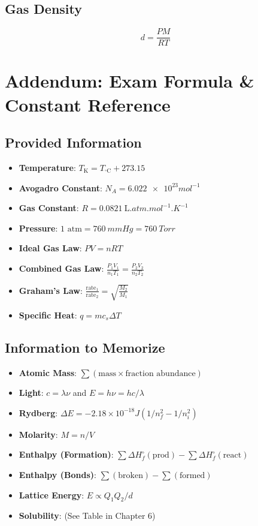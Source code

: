 \documentclass[11pt]{article}
\begin{document}
\subsection{Gas Density}
\begin{tcolorbox}[memorize, title=Gas Density (Must Memorize)]
    \[ d = \frac{PM}{RT} \]
\end{tcolorbox}

\newpage

\section*{Addendum: Exam Formula \& Constant Reference}

\subsection*{Provided Information}
\begin{itemize}
    \item \textbf{Temperature}: $T_{\si{\kelvin}} = T_{^\circ\text{C}} + 273.15$
    \item \textbf{Avogadro Constant}: $N_A = \num{6.022e23} \si{mol^{-1}}$
    \item \textbf{Gas Constant}: $R = \SI{0.0821}{\liter.atm.mol^{-1}.K^{-1}}$
    \item \textbf{Pressure}: $1 \text{ atm} = \SI{760}{mmHg} = \SI{760}{Torr}$
    \item \textbf{Ideal Gas Law}: $PV = nRT$
    \item \textbf{Combined Gas Law}: $\frac{P_1V_1}{n_1T_1} = \frac{P_2V_2}{n_2T_2}$
    \item \textbf{Graham's Law}: $\frac{\text{rate}_1}{\text{rate}_2} = \sqrt{\frac{M_2}{M_1}}$
    \item \textbf{Specific Heat}: $q = m c_s \Delta T$
\end{itemize}

\subsection*{Information to Memorize}
\begin{itemize}
    \item \textbf{Atomic Mass}: $\sum (\text{mass} \times \text{fraction abundance})$
    \item \textbf{Light}: $c = \lambda \nu$ and $E = h\nu = hc/\lambda$
    \item \textbf{Rydberg}: $\Delta E = -2.18 \times 10^{-18} \si{J} (1/n_f^2 - 1/n_i^2)$
    \item \textbf{Molarity}: $M = n/V$
    \item \textbf{Enthalpy (Formation)}: $\sum \Delta H_f^\circ(\text{prod}) - \sum \Delta H_f^\circ(\text{react})$
    \item \textbf{Enthalpy (Bonds)}: $\sum (\text{broken}) - \sum (\text{formed})$
    \item \textbf{Lattice Energy}: $E \propto Q_1Q_2/d$
    \item \textbf{Solubility}: (See Table in Chapter 6)
\end{itemize}
\end{document}
